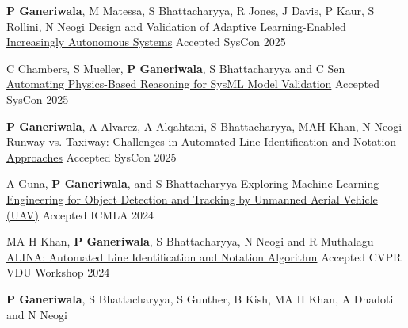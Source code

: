 \begin{cventries}
{\begin{cvitems}
\end{cvitems}
}
\cventry
{\textbf{P Ganeriwala}, M Matessa, S Bhattacharyya, R Jones, J Davis, P Kaur, S Rollini, N Neogi}
{\href{https://ieeexplore.ieee.org/document/11014784}{Design and Validation of Adaptive Learning-Enabled Increasingly Autonomous Systems}}
{Accepted}
{SysCon 2025} 
{ %
\begin{cvitems}
\end{cvitems}
}
\cventry
{C Chambers, S Mueller, \textbf{P Ganeriwala}, S Bhattacharyya and C Sen}
{\href{https://ieeexplore.ieee.org/document/11014788}{Automating Physics-Based Reasoning for SysML Model Validation}}
{Accepted}
{SysCon 2025} 
{ %
\begin{cvitems}
\end{cvitems}
}
\cventry
{\textbf{P Ganeriwala}, A Alvarez, A Alqahtani, S Bhattacharyya, MAH Khan, N Neogi}
{\href{https://ieeexplore.ieee.org/document/11014782}{Runway vs. Taxiway: Challenges in Automated Line Identification and Notation Approaches}}
{Accepted}
{SysCon 2025} 
{ %
\begin{cvitems}
\end{cvitems}
}
\cventry
{A Guna, \textbf{P Ganeriwala}, and S Bhattacharyya}
{\href{https://ieeexplore.ieee.org/document/10903281}{Exploring Machine Learning Engineering for Object Detection and Tracking by Unmanned Aerial Vehicle (UAV)}}
{Accepted}
{ICMLA 2024} 
{ %
\begin{cvitems}
\end{cvitems}
}
\cventry
{MA H Khan, \textbf{P Ganeriwala}, S Bhattacharyya, N Neogi and R Muthalagu }
{\href{https://openaccess.thecvf.com/content/CVPR2024W/VDU/html/Khan_ALINA_Advanced_Line_Identification_and_Notation_Algorithm_CVPRW_2024_paper.html}{ALINA: Automated Line Identification and Notation Algorithm}}
{Accepted}
{CVPR VDU Workshop 2024} 
{ %
\begin{cvitems}
\end{cvitems}
}
\cventry
{\textbf{P Ganeriwala}, S Bhattacharyya, S Gunther, B Kish, MA H Khan, A Dhadoti and N Neogi}

\end{cventries}
